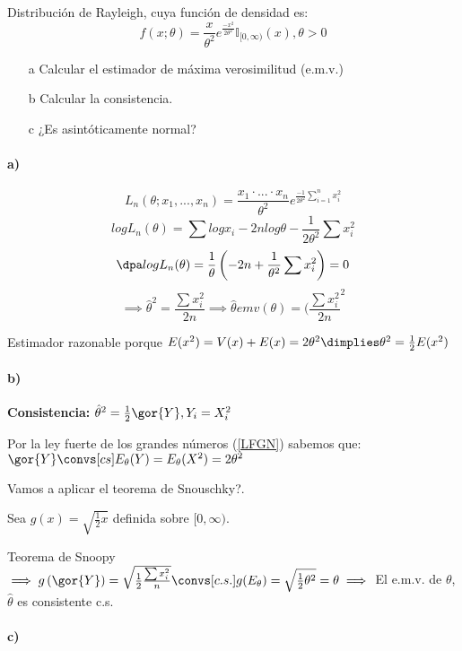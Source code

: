 \begin{problem}[5]
Distribución de Rayleigh, cuya función de densidad es:
\[f(x;\theta) = \frac{x}{\theta^2} e^{\frac{-x^2}{2\theta^2}} \mathbb{I}_{[0,\infty)} (x), \theta > 0\]

\begin{itemize}
\item[a]Calcular el estimador de máxima verosimilitud (e.m.v.)
\item[b]Calcular la consistencia.
\item[c] ¿Es asintóticamente normal?
\end{itemize}

\solution

\paragraph{a)}

\[L_n(\theta;x_1,...,x_n) = \frac{x_1 \cdot ... \cdot x_n}{\theta^2} e^{\frac{-1}{2\theta^2} \sum_{i=1}^n x_i^2}\]
\[log L_n(\theta) = \sum log x_i - 2nlog\theta -\frac{1}{2\theta^2}\sum x_i^2\]
\[\dpa log L_n(\theta) = \frac{1}{\theta} \left(-2n+\frac{1}{\theta^2}\sum x_i^2\right) = 0\]
\[\implies \hat{\theta}^2 = \frac{\sum x_i^2}{2n} \implies \hat{\theta} emv(\theta) = (\frac{\sum x_i^2}{2n}^2\]

Estimador razonable porque $E(x^2) = V(x) + E(x) = 2\theta^2 \dimplies \theta^2 = \frac{1}{2} E(x^2)$

\paragraph{b)}
\textbf{Consistencia:} $\hat{\theta}^2 = \frac{1}{2} \gor{Y}, Y_i = X_i^2$

Por la ley fuerte de los grandes números (\ref{LFGN}) sabemos que: $\gor{Y} \convs[cs] E_{\theta}(Y) = E_{\theta}(X^2) = 2\theta^2$

Vamos a aplicar el teorema de Snouschky?.

Sea $g(x) = \sqrt{\frac{1}{2}x}$ definida sobre $[0,\infty)$.

Teorema de Snoopy $\implies g\left(\gor{Y}\right) = \sqrt{\frac{1}{2} \frac{\sum x_i^2}{n}} \convs[c.s.] g(E_{\theta}) = \sqrt{\frac{1}{2}\theta^2} = \theta \implies $ El e.m.v. de $\theta$, $\hat{\theta}$ es consistente c.s.


\paragraph{c)}


\end{problem}
